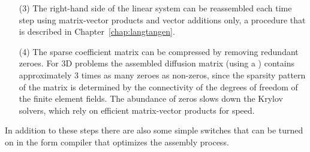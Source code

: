 \begin{itemize}
\item[(3)] The right-hand side of the linear system can be reassembled
  each time step using matrix-vector products and vector additions
  only, a procedure that is described in Chapter~\ref{chap:langtangen}.

\item[(4)] The sparse coefficient matrix can be compressed by removing
  redundant zeroes. For 3D problems the assembled diffusion matrix
  (using a ) contains approximately 3 times
  as many zeroes as non-zeros, since the sparsity pattern of the
  matrix is determined by the connectivity of the degrees of freedom
  of the finite element fields. The abundance of zeros slows down the
  Krylov solvers, which rely on efficient matrix-vector products for
  speed.

\end{itemize}
In addition to these steps there are also some simple switches that
can be turned on in the form compiler that optimizes the assembly
process.

